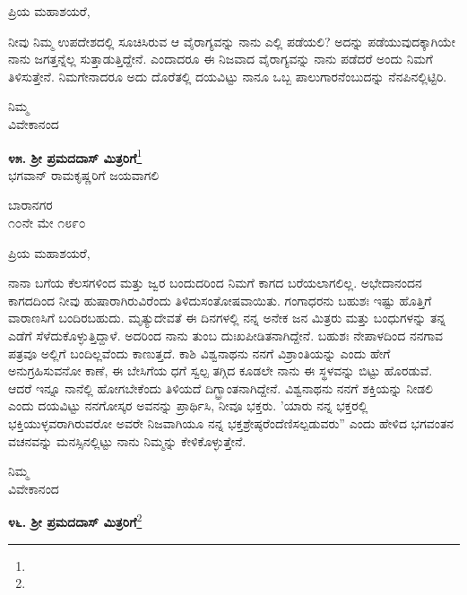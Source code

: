 \noindent
ಪ್ರಿಯ ಮಹಾಶಯರೆ,

ನೀವು ನಿಮ್ಮ ಉಪದೇಶದಲ್ಲಿ ಸೂಚಿಸಿರುವ ಆ ವೈರಾಗ್ಯವನ್ನು ನಾನು ಎಲ್ಲಿ ಪಡೆಯಲಿ? ಅದನ್ನು ಪಡೆಯುವುದಕ್ಕಾಗಿಯೇ ನಾನು ಜಗತ್ತನ್ನೆಲ್ಲ ಸುತ್ತಾಡುತ್ತಿದ್ದೇನೆ. ಎಂದಾದರೂ ಈ ನಿಜವಾದ ವೈರಾಗ್ಯವನ್ನು ನಾನು ಪಡೆದರೆ ಅಂದು ನಿಮಗೆ ತಿಳಿಸುತ್ತೇನೆ. ನಿಮಗೇನಾದರೂ ಅದು ದೊರೆತಲ್ಲಿ ದಯವಿಟ್ಟು ನಾನೂ ಒಬ್ಬ ಪಾಲುಗಾರನೆಂಬುದನ್ನು ನೆನಪಿನಲ್ಲಿಟ್ಟಿರಿ.

\vspace{-0.3cm}

{\flushright
ನಿಮ್ಮ\\ವಿವೇಕಾನಂದ\par}
\vspace{-0.3cm}

\begin{center}
\textbf{೪೫. ಶ‍್ರೀ ಪ್ರಮದದಾಸ್ ಮಿತ್ರರಿಗೆ}\footnote{}\\ ಭಗವಾನ್ ರಾಮಕೃಷ್ಣರಿಗೆ ಜಯವಾಗಲಿ
\end{center}

\vspace{-0.65cm}

\begin{flushright}
ಬಾರಾನಗರ\\೧೦ನೇ ಮೇ ೧೮೯೦
\end{flushright}
\vspace{-0.3cm}

\noindent
ಪ್ರಿಯ ಮಹಾಶಯರೆ,

ನಾನಾ ಬಗೆಯ ಕೆಲಸಗಳಿಂದ ಮತ್ತು ಜ್ವರ ಬಂದುದರಿಂದ ನಿಮಗೆ ಕಾಗದ ಬರೆಯಲಾಗಲಿಲ್ಲ. ಅಭೇದಾನಂದನ ಕಾಗದದಿಂದ ನೀವು ಹುಷಾರಾಗಿರುವಿರೆಂದು ತಿಳಿದು\break ಸಂತೋಷವಾಯಿತು. ಗಂಗಾಧರನು ಬಹುಶಃ ಇಷ್ಟು ಹೊತ್ತಿಗೆ ವಾರಾಣಸಿಗೆ ಬಂದಿರಬಹುದು. ಮೃತ್ಯುದೇವತೆ ಈ ದಿನಗಳಲ್ಲಿ ನನ್ನ ಅನೇಕ ಜನ ಮಿತ್ರರು ಮತ್ತು ಬಂಧುಗಳನ್ನು ತನ್ನ ಎಡೆಗೆ ಸೆಳೆದುಕೊಳ್ಳುತ್ತಿದ್ದಾಳೆ. ಅದರಿಂದ ನಾನು ತುಂಬ ದುಃಖಪೀಡಿತನಾಗಿದ್ದೇನೆ. ಬಹುಶಃ ನೇಪಾಳದಿಂದ ನನಗಾವ ಪತ್ರವೂ ಅಲ್ಲಿಗೆ ಬಂದಿಲ್ಲವೆಂದು ಕಾಣುತ್ತದೆ. ಕಾಶಿ ವಿಶ್ವನಾಥನು ನನಗೆ ವಿಶ್ರಾಂತಿಯನ್ನು ಎಂದು ಹೇಗೆ ಅನುಗ್ರಹಿಸುವನೋ ಕಾಣೆ, ಈ ಬೇಸಿಗೆಯ ಧಗೆ ಸ್ವಲ್ಪ ತಗ್ಗಿದ ಕೂಡಲೇ ನಾನು ಈ ಸ್ಥಳವನ್ನು ಬಿಟ್ಟು ಹೊರಡುವೆ. ಆದರೆ ಇನ್ನೂ ನಾನೆಲ್ಲಿ ಹೋಗಬೇಕೆಂದು ತಿಳಿಯದೆ ದಿಗ್ಭ್ರಾಂತನಾಗಿದ್ದೇನೆ. ವಿಶ್ವನಾಥನು ನನಗೆ ಶಕ್ತಿಯನ್ನು ನೀಡಲಿ ಎಂದು ದಯವಿಟ್ಟು ನನಗೋಸ್ಕರ ಅವನನ್ನು ಪ್ರಾರ್ಥಿಸಿ, ನೀವೂ ಭಕ್ತರು. ’ಯಾರು ನನ್ನ ಭಕ್ತರಲ್ಲಿ ಭಕ್ತಿಯುಳ್ಳವರಾಗಿರುವರೋ ಅವರೇ ನಿಜವಾಗಿಯೂ ನನ್ನ ಭಕ್ತಶ್ರೇಷ್ಠರೆಂದೆಣಿಸಲ್ಪಡುವರು” ಎಂದು ಹೇಳಿದ ಭಗವಂತನ ವಚನವನ್ನು ಮನಸ್ಸಿನಲ್ಲಿಟ್ಟು ನಾನು ನಿಮ್ಮನ್ನು ಕೇಳಿಕೊಳ್ಳುತ್ತೇನೆ.

\vspace{-0.5cm}

{\flushright
ನಿಮ್ಮ\\ವಿವೇಕಾನಂದ\par}

\begin{center}
\textbf{೪೬. ಶ‍್ರೀ ಪ್ರಮದದಾಸ್ ಮಿತ್ರರಿಗೆ}\footnote{}
\end{center}

